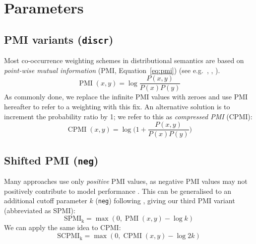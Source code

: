 \documentclass[11pt]{article}
\begin{document}
\section{Parameters}
\label{sec:parameters}



\subsection{PMI variants (\texttt{discr})}
\label{sec:pmi-variants}

Most co-occurrence weighting schemes in distributional semantics are based on \emph{point-wise mutual information} (PMI, Equation~\ref{eq:pmi}) (see e.g.~, , ).
%
\begin{equation}
  \label{eq:pmi}
  \operatorname{PMI}(x, y) = \log\frac{P(x,y)}{P(x)P(y)}
\end{equation}
%
%
As commonly done, we replace the infinite PMI values with zeroes and use PMI hereafter to refer to a
weighting with this fix.
%
An alternative solution is to increment the probability ratio by 1; we refer to this as \textit{compressed PMI} (CPMI):
%
\begin{equation}
  \label{eq:cpmi}
  \operatorname{CPMI}(x, y) = \log\Big( 1 + \frac{P(x,y)}{P(x)P(y)} \Big)
\end{equation}




\subsection{Shifted PMI (\texttt{neg})}
\label{sec:shifted-pmi}

Many approaches use only \emph{positive} PMI values, as  negative PMI values may not positively contribute to model performance \cite{Turney:2010:FMV:1861751.1861756}. This can be generalised to an additional cutoff parameter $k$ (\texttt{neg}) following , giving our third PMI variant (abbreviated as SPMI):
%
\begin{equation}
  \label{eq:ppmi}
  \operatorname{SPMI_k} = \max (0, \operatorname{PMI}(x, y) - \log k)
\end{equation}
%
We can apply the same idea to CPMI:
%
\begin{equation}
  \label{eq:pcpmi}
  \operatorname{SCPMI_k} = \max (0, \operatorname{CPMI}(x, y) - \log 2k)
\end{equation}
\end{document}

